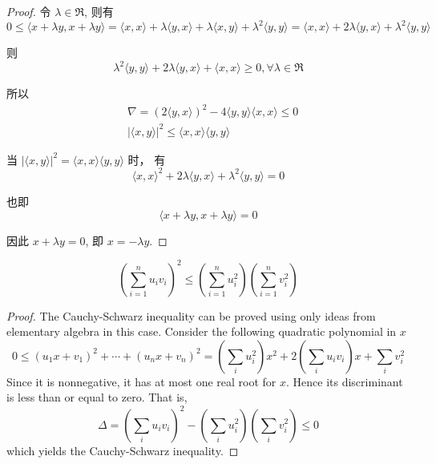 \begin{proof}
    令 $\lambda \in \mathfrak{R}$, 则有 
    \begin{equation}0 \leq\langle x+\lambda y, x+\lambda y\rangle=\langle x, x\rangle+\lambda\langle y, x\rangle+\lambda\langle x, y\rangle+\lambda^{2}\langle y, y\rangle=\langle x, x\rangle+2 \lambda\langle y, x\rangle+\lambda^{2}\langle y, y\rangle\end{equation}

则 
\begin{equation}\lambda^{2}\langle y, y\rangle+2 \lambda\langle y, x\rangle+\langle x, x\rangle \geq 0, \forall \lambda \in \mathfrak{R}\end{equation}

所以
\begin{equation}
\begin{aligned}
&\nabla=(2\langle y, x\rangle)^{2}-4\langle y, y\rangle\langle x, x\rangle \leq 0 \\
&|\langle x, y\rangle|^{2} \leq\langle x, x\rangle\langle y, y\rangle
\end{aligned}
\end{equation}

当 $|\langle x, y\rangle|^{2}=\langle x, x\rangle\langle y, y\rangle$ 时， 有 \begin{equation}\langle x, x\rangle^{2}+2 \lambda\langle y, x\rangle+\lambda^{2}\langle y, y\rangle=0\end{equation}

也即 \begin{equation}\langle x+\lambda y, x+\lambda y\rangle=0\end{equation}

因此 $x+\lambda y=0$, 即 $x=-\lambda y$.
\end{proof}

\begin{theorem}

    \begin{equation}\left(\sum_{i=1}^{n} u_{i} v_{i}\right)^{2} \leq\left(\sum_{i=1}^{n} u_{i}^{2}\right)\left(\sum_{i=1}^{n} v_{i}^{2}\right)\end{equation}
\end{theorem}

\begin{proof}
    The Cauchy-Schwarz inequality can be proved using only ideas from elementary algebra in this case. Consider the following quadratic polynomial in $x$
\begin{equation}
0 \leq\left(u_{1} x+v_{1}\right)^{2}+\cdots+\left(u_{n} x+v_{n}\right)^{2}=\left(\sum_{i} u_{i}^{2}\right) x^{2}+2\left(\sum_{i} u_{i} v_{i}\right) x+\sum_{i} v_{i}^{2}
\end{equation}
Since it is nonnegative, it has at most one real root for $x$. Hence its discriminant is less than or equal to zero. That is,
\begin{equation}
\Delta = \left(\sum_{i} u_{i} v_{i}\right)^{2}-\left(\sum_{i} u_{i}^{2}\right)\left(\sum_{i} v_{i}^{2}\right) \leq 0
\end{equation}
which yields the Cauchy-Schwarz inequality.
\end{proof}

